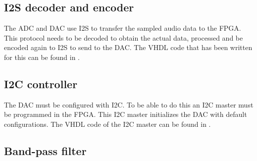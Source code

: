 \subsection{I2S decoder and encoder}
The ADC and DAC use I2S to transfer the sampled audio data to the FPGA. This protocol needs to be decoded to obtain the actual data, processed and be encoded again to I2S to send to the DAC. The VHDL code that has been written for this can be found in . 

\subsection{I2C controller}
The DAC must be configured with I2C. To be able to do this an I2C master must be programmed in the FPGA. This I2C master initializes the DAC with default configurations. The VHDL code of the I2C master can be found in . 

\subsection{Band-pass filter}

